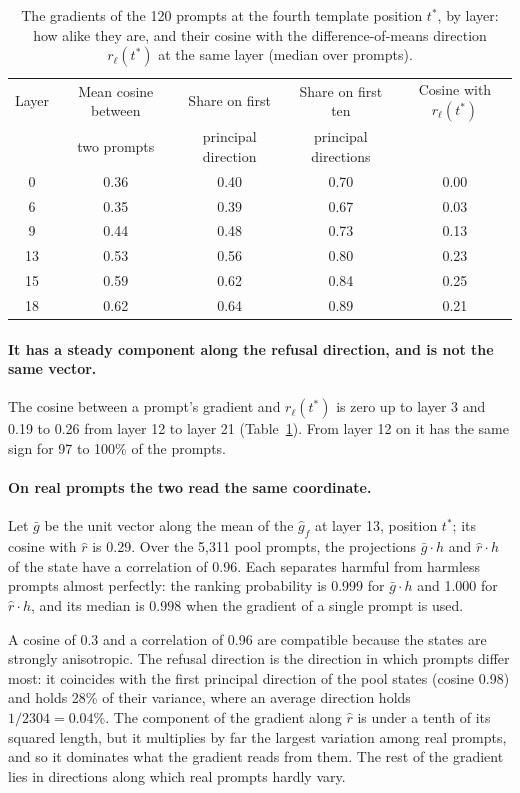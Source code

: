 \documentclass[11pt]{article}
\begin{document}
\begin{table}[ht]
\centering
\caption{The gradients of the 120 prompts at the fourth template position $t^*$, by layer: how alike they are, and their cosine with the difference-of-means direction $r_\ell(t^*)$ at the same layer (median over prompts).}
\label{tab:gradshared}
\begin{tabular}{ccccc}
\toprule
Layer & Mean cosine between & Share on first & Share on first ten & Cosine with $r_\ell(t^*)$ \\
 & two prompts & principal direction & principal directions & \\
\midrule
0 & 0.36 & 0.40 & 0.70 & 0.00 \\
6 & 0.35 & 0.39 & 0.67 & 0.03 \\
9 & 0.44 & 0.48 & 0.73 & 0.13 \\
13 & 0.53 & 0.56 & 0.80 & 0.23 \\
15 & 0.59 & 0.62 & 0.84 & 0.25 \\
18 & 0.62 & 0.64 & 0.89 & 0.21 \\
\bottomrule
\end{tabular}
\end{table}

\paragraph{It has a steady component along the refusal direction, and is not the same vector.} The cosine between a prompt's gradient and $r_\ell(t^*)$ is zero up to layer 3 and 0.19 to 0.26 from layer 12 to layer 21 (Table~\ref{tab:gradshared}). From layer 12 on it has the same sign for 97 to 100\% of the prompts.

\paragraph{On real prompts the two read the same coordinate.} Let $\bar g$ be the unit vector along the mean of the $\hat g_f$ at layer 13, position $t^*$; its cosine with $\hat r$ is 0.29. Over the 5{,}311 pool prompts, the projections $\bar g\cdot h$ and $\hat r\cdot h$ of the state have a correlation of 0.96. Each separates harmful from harmless prompts almost perfectly: the ranking probability is 0.999 for $\bar g\cdot h$ and 1.000 for $\hat r\cdot h$, and its median is 0.998 when the gradient of a single prompt is used.

A cosine of 0.3 and a correlation of 0.96 are compatible because the states are strongly anisotropic. The refusal direction is the direction in which prompts differ most: it coincides with the first principal direction of the pool states (cosine 0.98) and holds 28\% of their variance, where an average direction holds $1/2304=0.04\%$. The component of the gradient along $\hat r$ is under a tenth of its squared length, but it multiplies by far the largest variation among real prompts, and so it dominates what the gradient reads from them. The rest of the gradient lies in directions along which real prompts hardly vary.
\end{document}

